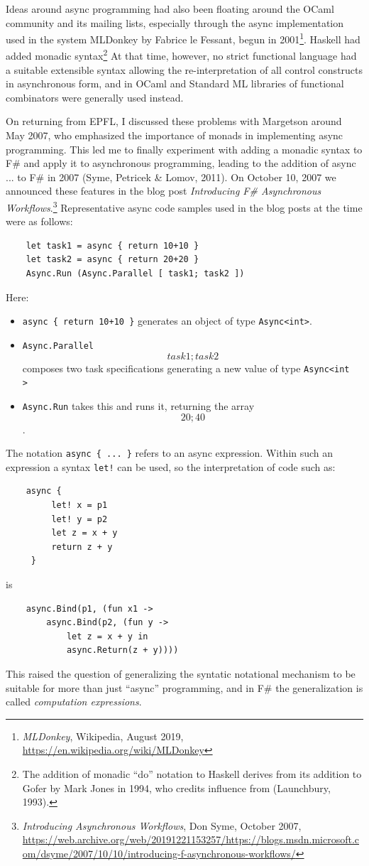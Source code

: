 \documentclass[acmsmall]{acmart}\settopmatter{}
\begin{document}
Ideas around async programming had also been floating around the OCaml community and its mailing lists, especially through the async implementation used in the system MLDonkey by Fabrice le Fessant, begun in 2001\footnote{\textit{MLDonkey}, Wikipedia, August 2019, \url{https://en.wikipedia.org/wiki/MLDonkey}}.  Haskell had added monadic syntax\footnote{The addition of  monadic “do” notation to Haskell derives from its addition to Gofer by Mark Jones in 1994, who credits influence from (Launchbury, 1993).} At that time, however,
no strict functional language had a suitable extensible syntax allowing the re-interpretation of all control constructs in asynchronous form, and in
OCaml and Standard ML libraries of functional combinators were generally used instead.  

On returning from EPFL, I discussed these problems with Margetson around May 2007, who emphasized the importance of monads in implementing async programming. This led me to finally experiment with adding a monadic syntax to F\# and apply it to asynchronous programming, leading to the addition of async { ... } to F\# in 2007 (Syme, Petricek \& Lomov, 2011).  On October 10, 2007 we announced these features in the blog post \textit{Introducing F\# Asynchronous Workflows}.\footnote{\textit{Introducing Asynchronous Workflows}, Don Syme, October 2007, \url{https://web.archive.org/web/20191221153257/https://blogs.msdn.microsoft.com/dsyme/2007/10/10/introducing-f-asynchronous-workflows/}}  Representative async code samples used in the blog posts at the time were as follows:

\begin{verbatim}
    let task1 = async { return 10+10 }
    let task2 = async { return 20+20 }
    Async.Run (Async.Parallel [ task1; task2 ])
\end{verbatim}

Here:
\begin{itemize}
\item \texttt{async \{ return 10+10 \}} generates an object of type \texttt{Async<int>}.  
\item \texttt{Async.Parallel \[ task1; task2 \]} composes two task specifications generating a new value of type \texttt{Async<int\[\]>}
\item \texttt{Async.Run} takes this and runs it, returning the array \texttt{\[20; 40\]}. 
\end{itemize}

The notation \texttt{async \{ ... \}} refers to an async expression. Within such an expression a syntax \texttt{let!} can be used, so the interpretation of code such as:
\begin{verbatim}
    async { 
         let! x = p1 
         let! y = p2
         let z = x + y
         return z + y 
     }
\end{verbatim}
is
\begin{verbatim}
    async.Bind(p1, (fun x1 -> 
        async.Bind(p2, (fun y -> 
            let z = x + y in
            async.Return(z + y))))
\end{verbatim}
This raised the question of generalizing the syntatic notational mechanism to be suitable for more than just ``async'' programming, and in F\# the 
generalization is called \emph{computation expressions}.
\end{document}
